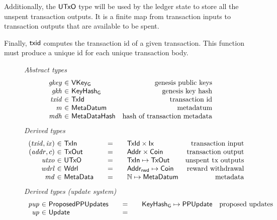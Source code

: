 Additionally, the $\mathsf{UTxO}$ type will be used by the ledger state to store all the
unspent transaction outputs. It is a finite map from transaction inputs
to transaction outputs that are available to be spent.

Finally, $\mathsf{txid}$ computes the transaction id of a given transaction.
This function must produce a unique id for each unique transaction body.

\begin{figure*}[htb]
  \emph{Abstract types}
  \begin{equation*}
    \begin{array}{r@{~\in~}lr}
      \var{gkey} & \VKeyGen & \text{genesis public keys}\\
      \var{gkh} & \KeyHashGen & \text{genesis key hash}\\
      \var{txid} & \TxId & \text{transaction id}\\
      \var{m} & \MetaDatum & \text{metadatum}\\
      \var{mdh} & \MetaDataHash & \text{hash of transaction metadata}\\
    \end{array}
  \end{equation*}
  \emph{Derived types}
  \begin{equation*}
    \begin{array}{r@{~\in~}l@{\qquad=\qquad}lr}
      (\var{txid}, \var{ix})
      & \TxIn
      & \TxId \times \Ix
      & \text{transaction input}
      \\
      (\var{addr}, c)
      & \type{TxOut}
      & \Addr \times \Coin
      & \text{transaction output}
      \\
      \var{utxo}
      & \UTxO
      & \TxIn \mapsto \TxOut
      & \text{unspent tx outputs}
      \\
      \var{wdrl}
      & \Wdrl
      & \AddrRWD \mapsto \Coin
      & \text{reward withdrawal}
      \\
      \var{md}
      & \MetaData
      & \N \mapsto \MetaDatum
      & \text{metadata}
    \end{array}
  \end{equation*}
  \emph{Derived types (update system)}
  \begin{equation*}
    \begin{array}{r@{~\in~}l@{\qquad=\qquad}lr}
      \var{pup}
      & \ProposedPPUpdates
      & \KeyHashGen \mapsto \PPUpdate
      & \text{proposed updates}
      \\
      \var{up}
      & \Update

\end{array}
\end{equation*}
\end{figure*}
